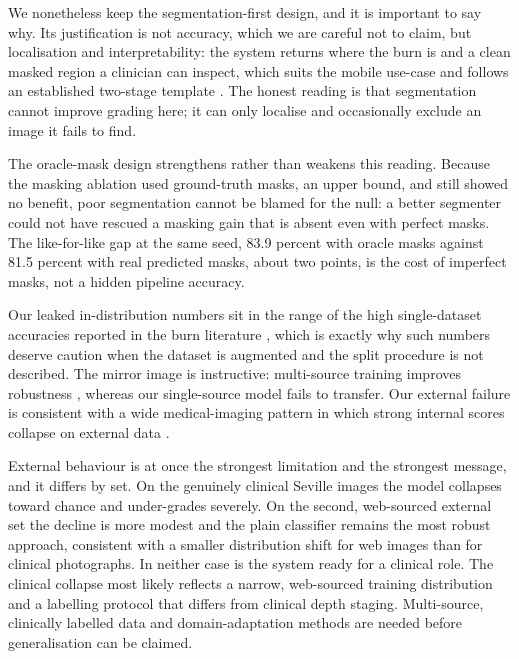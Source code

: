 \documentclass{elektr}
\begin{document}
We nonetheless keep the segmentation-first design, and it is important to say why. Its justification is not accuracy, which we are careful not to claim, but localisation and interpretability: the system returns where the burn is and a clean masked region a clinician can inspect, which suits the mobile use-case and follows an established two-stage template \cite{bruno,yildiz}. The honest reading is that segmentation cannot improve grading here; it can only localise and occasionally exclude an image it fails to find.

The oracle-mask design strengthens rather than weakens this reading. Because the masking ablation used ground-truth masks, an upper bound, and still showed no benefit, poor segmentation cannot be blamed for the null: a better segmenter could not have rescued a masking gain that is absent even with perfect masks. The like-for-like gap at the same seed, 83.9 percent with oracle masks against 81.5 percent with real predicted masks, about two points, is the cost of imperfect masks, not a hidden pipeline accuracy.

Our leaked in-distribution numbers sit in the range of the high single-dataset accuracies reported in the burn literature \cite{suha,nadeem,yildiz,ferdinand,fu2026review}, which is exactly why such numbers deserve caution when the dataset is augmented and the split procedure is not described. The mirror image is instructive: multi-source training improves robustness \cite{elsarta2025}, whereas our single-source model fails to transfer. Our external failure is consistent with a wide medical-imaging pattern in which strong internal scores collapse on external data \cite{zech2018,yu2022,martensson2020,roberts}.

External behaviour is at once the strongest limitation and the strongest message, and it differs by set. On the genuinely clinical Seville images the model collapses toward chance and under-grades severely. On the second, web-sourced external set the decline is more modest and the plain classifier remains the most robust approach, consistent with a smaller distribution shift for web images than for clinical photographs. In neither case is the system ready for a clinical role. The clinical collapse most likely reflects a narrow, web-sourced training distribution and a labelling protocol that differs from clinical depth staging. Multi-source, clinically labelled data and domain-adaptation methods are needed before generalisation can be claimed.
\end{document}
